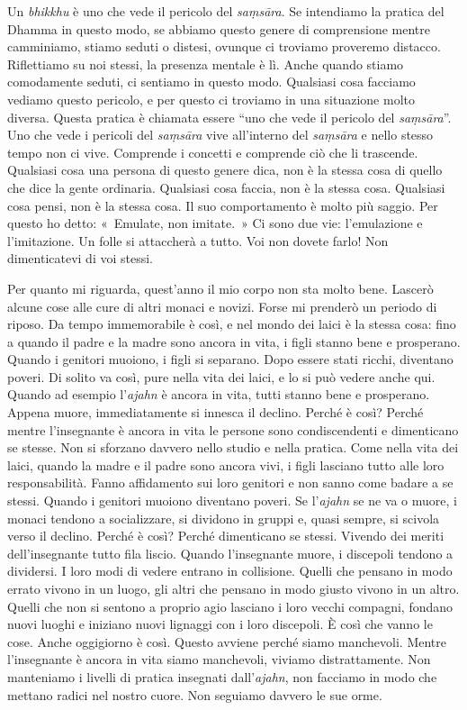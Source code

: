 Un \emph{bhikkhu} è uno che vede il pericolo del \emph{saṃsāra}. Se
intendiamo la pratica del Dhamma in questo modo, se abbiamo questo
genere di comprensione mentre camminiamo, stiamo seduti o distesi,
ovunque ci troviamo proveremo distacco. Riflettiamo su noi stessi, la
presenza mentale è lì. Anche quando stiamo comodamente seduti, ci
sentiamo in questo modo. Qualsiasi cosa facciamo vediamo questo
pericolo, e per questo ci troviamo in una situazione molto diversa.
Questa pratica è chiamata essere ``uno che vede il pericolo del
\emph{saṃsāra}''. Uno che vede i pericoli del \emph{saṃsāra} vive
all'interno del \emph{saṃsāra} e nello stesso tempo non ci vive.
Comprende i concetti e comprende ciò che li trascende. Qualsiasi cosa
una persona di questo genere dica, non è la stessa cosa di quello che
dice la gente ordinaria. Qualsiasi cosa faccia, non è la stessa cosa.
Qualsiasi cosa pensi, non è la stessa cosa. Il suo comportamento è molto
più saggio. Per questo ho detto: «~Emulate, non imitate.~» Ci sono due
vie: l'emulazione e l'imitazione. Un folle si attaccherà a tutto. Voi
non dovete farlo! Non dimenticatevi di voi stessi.

Per quanto mi riguarda, quest'anno il mio corpo non sta molto bene.
Lascerò alcune cose alle cure di altri monaci e novizi. Forse mi
prenderò un periodo di riposo. Da tempo immemorabile è così, e nel mondo
dei laici è la stessa cosa: fino a quando il padre e la madre sono
ancora in vita, i figli stanno bene e prosperano. Quando i genitori
muoiono, i figli si separano. Dopo essere stati ricchi, diventano
poveri. Di solito va così, pure nella vita dei laici, e lo si può vedere
anche qui. Quando ad esempio l'\emph{ajahn} è ancora in vita, tutti
stanno bene e prosperano. Appena muore, immediatamente si innesca il
declino. Perché è così? Perché mentre l'insegnante è ancora in vita le
persone sono condiscendenti e dimenticano se stesse. Non si sforzano
davvero nello studio e nella pratica. Come nella vita dei laici, quando
la madre e il padre sono ancora vivi, i figli lasciano tutto alle loro
responsabilità. Fanno affidamento sui loro genitori e non sanno come
badare a se stessi. Quando i genitori muoiono diventano poveri. Se
l'\emph{ajahn} se ne va o muore, i monaci tendono a socializzare, si
dividono in gruppi e, quasi sempre, si scivola verso il declino. Perché
è così? Perché dimenticano se stessi. Vivendo dei meriti dell'insegnante
tutto fila liscio. Quando l'insegnante muore, i discepoli tendono a
dividersi. I loro modi di vedere entrano in collisione. Quelli che
pensano in modo errato vivono in un luogo, gli altri che pensano in modo
giusto vivono in un altro. Quelli che non si sentono a proprio agio
lasciano i loro vecchi compagni, fondano nuovi luoghi e iniziano nuovi
lignaggi con i loro discepoli. È così che vanno le cose. Anche
oggigiorno è così. Questo avviene perché siamo manchevoli. Mentre
l'insegnante è ancora in vita siamo manchevoli, viviamo distrattamente.
Non manteniamo i livelli di pratica insegnati dall'\emph{ajahn}, non
facciamo in modo che mettano radici nel nostro cuore. Non seguiamo
davvero le sue orme.

